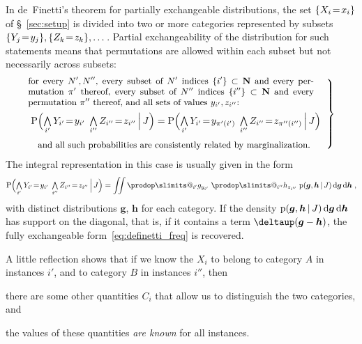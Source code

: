 \documentclass[\ifafour a4paper,12pt,\else a5paper,10pt,\fi%
onecolumn,oneside,article,%
british%
]{memoir}
\makeatletter
\theoremstyle{remark}
\theoremstyle{innote}
\def\prod{\DOTSI\prodop\slimits@}
\newcommand*{\delt}{\deltaup}%
\newcommand*{\di}{\mathrm{d}}%
\newcommand*{\NN}{\bm{\mathrm{N}}}
\newcommand*{\Land}{\mathop{\textstyle\bigwedge}}
\DeclarePairedDelimiter\set{\{}{\}}
\newcommand*{\pf}{\mathrm{p}}%
\newcommand*{\p}{\mathrm{P}}%
\renewcommand*{\|}[1][]{\nonscript\,#1\vert\nonscript\,\mathopen{}}
\newcommand*{\sect}{\S}%
\renewcommand*{\=}{\TextOrMath\texteq\eq}
\newcommand*{\X}[1]{X_{#1}}
\newcommand*{\x}[1]{x_{#1}}
\newcommand*{\Y}[1]{Y_{#1}}
\newcommand*{\y}[1]{y_{#1}}
\newcommand*{\Z}[1]{Z_{#1}}
\newcommand*{\z}[1]{z_{#1}}
\newcommand*{\C}[1]{C_{#1}}
\newcommand*{\cc}[1]{c_{#1}}
\newcommand*{\bg}{\bm{g}}
\newcommand*{\bh}{\bm{h}}
\newcommand*{\zI}{J}
\makeatother
\begin{document}
In de~Finetti's theorem for partially exchangeable distributions, the set
$\set{\X{i}\=\x{i}}$ of \sect~\ref{sec:setup} is divided into two or more
categories represented by subsets
$\set{\Y{j}\=\y{j}}, \set{\Z{k}\=\z{k}}, \dotsc$. Partial exchangeability
of the distribution for such statements means that permutations are allowed
within each subset but not necessarily across subsets:
\begin{equation}
  \label{eq:usual_part_exchangeable}\left.
\begin{multlined}%
  \parbox{0.85\linewidth}{\small for every $N',N''$,
    every subset of $N'$ indices $\set{i'} \subset \NN$ and
    every permutation $\pi'$ thereof,
    every subset of $N''$ indices $\set{i''} \subset \NN$ and
    every permutation $\pi''$ thereof, and all sets of
    values $\y{i'},\z{i''}$:}
  \\[\jot]
  \p\Bigl( \Land_{i'}\Y{i'}\=\y{i'} \;
  \Land_{i''}\Z{i''}\=\z{i''} \|[\Big] \zI\Bigr) =
  \p\Bigl( \Land_{i'}\Y{i'}\=\y{\pi'(i')} \;
  \Land_{i''}\Z{i''}\=\z{\pi''(i'')} \|[\Big] \zI\Bigr)
  \\[\jot]
  \shoveleft{\text{\small and all such probabilities are consistently related by marginalization.}}
\end{multlined}\;\right\}
\end{equation}
The integral
representation in this case %
is usually given in the form
\begin{equation}
  \label{eq:partialdefinetti}
  \p\Bigl( \Land_{i'}\Y{i'}\=\y{i'} \;
  \Land_{i''}\Z{i''}\=\z{i''} \|[\Big] \zI\Bigr) =
  \iint
  \prod_{i'} g_{\y{i'}}\;
  \prod_{i''} h_{\z{i''}}\;
  \pf(\bg,\bh \| \zI)\,\di\bg\,\di\bh \;,
\end{equation}
with distinct distributions $\bg$, $\bh$ for each category. If the density
$\pf(\bg,\bh \| \zI)\,\di\bg\,\di\bh$ has support on the diagonal, that is,
if it contains a term $\delt(\bg-\bh)$, the fully exchangeable
form~\eqref{eq:definetti_freq} is recovered.

A little reflection shows that if we know the $\X{i}$ to belong to category
$A$ in instances $i'$, and to category $B$ in instances $i''$, then
\begin{enumerate*}[label=(\roman*)]
\item there are some other quantities $\C{i}$ that allow us to distinguish
  the two categories, and \item the values %
  of these quantities \emph{are known} for all instances.
\end{enumerate*}
\end{document}
